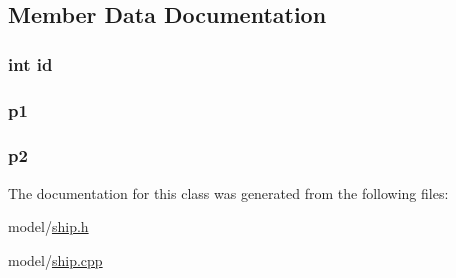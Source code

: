 \subsection{Member Data Documentation}
\subsubsection[{\texorpdfstring{id}{id}}]{\setlength{\rightskip}{0pt plus 5cm}int id\hspace{0.3cm}{\ttfamily [private]}}\hypertarget{classMODEL_1_1Ship_a7441ef0865bcb3db9b8064dd7375c1ea}{}\label{classMODEL_1_1Ship_a7441ef0865bcb3db9b8064dd7375c1ea}
\subsubsection[{\texorpdfstring{p1}{p1}}]{ p1\hspace{0.3cm}{\ttfamily [private]}}\hypertarget{classMODEL_1_1Ship_ad513d6f843f1e0539132467d503e4591}{}\label{classMODEL_1_1Ship_ad513d6f843f1e0539132467d503e4591}
\subsubsection[{\texorpdfstring{p2}{p2}}]{ p2\hspace{0.3cm}{\ttfamily [private]}}\hypertarget{classMODEL_1_1Ship_a04aa64d0927f4422e811828cbe685358}{}\label{classMODEL_1_1Ship_a04aa64d0927f4422e811828cbe685358}


The documentation for this class was generated from the following files\+:\begin{DoxyCompactItemize}
\item 
model/\hyperlink{ship_8h}{ship.\+h}\item 
model/\hyperlink{ship_8cpp}{ship.\+cpp}\end{DoxyCompactItemize}
